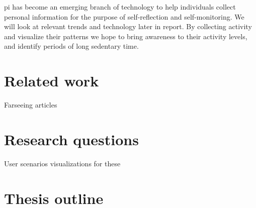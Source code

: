\gls{pi} has become an emerging branch of technology to help individuals collect personal information for the purpose of self-reflection and self-monitoring. We will look at relevant trends and technology later in report. By collecting activity and visualize their patterns we hope to bring awareness to their activity levels, and identify periods of long sedentary time. 

\section{Related work}
Farseeing articles
\section{Research questions}
User scenarios visualizations for these
\section{Thesis outline}